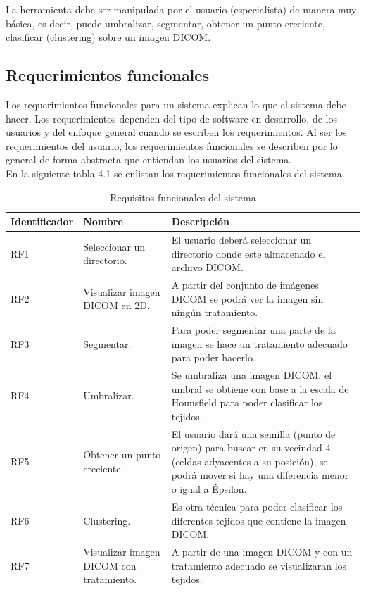 \documentclass[12pt]{report}
\begin{document}
La herramienta debe ser manipulada por el usuario (especialista) de manera muy básica, es decir, puede umbralizar, segmentar, obtener un punto creciente, clasificar (clustering) sobre un imagen DICOM.
\subsection{Requerimientos funcionales}
Los requerimientos funcionales para un sistema explican lo que el sistema debe hacer. Los requerimientos dependen del tipo de software en desarrollo, de los usuarios y del enfoque general cuando se escriben los requerimientos. Al ser los requerimientos del usuario, los requerimientos funcionales se describen por lo general de forma abstracta que entiendan los usuarios del sistema. \cite{isRF}\\ 

En la siguiente tabla 4.1 se enlistan los requerimientos funcionales del sistema.\\ 

\begin{table}[H]
\begin{center}
\begin{tabular}{|p{23mm}|p{35mm}|p{75mm}|}
\hline
 Identificador & Nombre & Descripción \\
\hline \hline 
RF1 & Seleccionar un directorio. & El usuario deberá seleccionar un directorio donde este almacenado el archivo DICOM.\\
\hline
RF2 & Visualizar imagen DICOM en 2D. & A partir del conjunto de imágenes DICOM se podrá ver la imagen sin ningún tratamiento.  \\
\hline
RF3 & Segmentar. & Para poder segmentar una parte de la imagen se hace un tratamiento adecuado para poder hacerlo.  \\
\hline
RF4 & Umbralizar. & Se umbraliza una imagen DICOM, el umbral se obtiene con base a la escala de Hounsfield para poder clasificar los tejidos.  \\
\hline
RF5 & Obtener un punto creciente. & El usuario dará una semilla (punto de origen) para buscar en su vecindad 4 (celdas adyacentes a su posición), se podrá mover si hay una diferencia menor o igual a Épsilon. \\
\hline
RF6 & Clustering. & Es otra técnica para poder clasificar los diferentes tejidos que contiene la imagen DICOM. \\
\hline
RF7 & Visualizar imagen DICOM con tratamiento. & A partir de una imagen DICOM y con un tratamiento adecuado se visualizaran los tejidos.\\
\hline
\end{tabular}
\caption{Requisitos funcionales del sistema}
\end{center}
\end{table}
\end{document}
